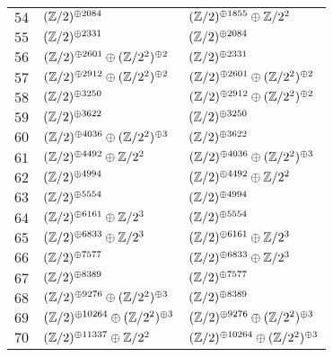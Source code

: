 \begin{supertabular}{|c|p{5.5cm}|p{5.5cm}|}
$54$%
&$(\mathbb{Z}/2)^{\oplus2084}$%
&$(\mathbb{Z}/2)^{\oplus1855}\oplus\mathbb{Z}/2^{2}$\\

$55$%
&$(\mathbb{Z}/2)^{\oplus2331}$%
&$(\mathbb{Z}/2)^{\oplus2084}$\\

$56$%
&$(\mathbb{Z}/2)^{\oplus2601}\oplus(\mathbb{Z}/2^{2})^{\oplus2}$%
&$(\mathbb{Z}/2)^{\oplus2331}$\\

$57$%
&$(\mathbb{Z}/2)^{\oplus2912}\oplus(\mathbb{Z}/2^{2})^{\oplus2}$%
&$(\mathbb{Z}/2)^{\oplus2601}\oplus(\mathbb{Z}/2^{2})^{\oplus2}$\\

$58$%
&$(\mathbb{Z}/2)^{\oplus3250}$%
&$(\mathbb{Z}/2)^{\oplus2912}\oplus(\mathbb{Z}/2^{2})^{\oplus2}$\\

$59$%
&$(\mathbb{Z}/2)^{\oplus3622}$%
&$(\mathbb{Z}/2)^{\oplus3250}$\\

$60$%
&$(\mathbb{Z}/2)^{\oplus4036}\oplus(\mathbb{Z}/2^{2})^{\oplus3}$%
&$(\mathbb{Z}/2)^{\oplus3622}$\\


$61$%
&$(\mathbb{Z}/2)^{\oplus4492}\oplus\mathbb{Z}/2^{2}$%
&$(\mathbb{Z}/2)^{\oplus4036}\oplus(\mathbb{Z}/2^{2})^{\oplus3}$\\

$62$%
&$(\mathbb{Z}/2)^{\oplus4994}$%
&$(\mathbb{Z}/2)^{\oplus4492}\oplus\mathbb{Z}/2^{2}$\\

$63$%
&$(\mathbb{Z}/2)^{\oplus5554}$%
&$(\mathbb{Z}/2)^{\oplus4994}$\\

$64$%
&$(\mathbb{Z}/2)^{\oplus6161}\oplus\mathbb{Z}/2^{3}$%
&$(\mathbb{Z}/2)^{\oplus5554}$\\

$65$%
&$(\mathbb{Z}/2)^{\oplus6833}\oplus\mathbb{Z}/2^{3}$%
&$(\mathbb{Z}/2)^{\oplus6161}\oplus\mathbb{Z}/2^{3}$\\

$66$%
&$(\mathbb{Z}/2)^{\oplus7577}$%
&$(\mathbb{Z}/2)^{\oplus6833}\oplus\mathbb{Z}/2^{3}$\\

$67$%
&$(\mathbb{Z}/2)^{\oplus8389}$%
&$(\mathbb{Z}/2)^{\oplus7577}$\\

$68$%
&$(\mathbb{Z}/2)^{\oplus9276}\oplus(\mathbb{Z}/2^{2})^{\oplus3}$%
&$(\mathbb{Z}/2)^{\oplus8389}$\\

$69$%
&$(\mathbb{Z}/2)^{\oplus10264}\oplus(\mathbb{Z}/2^{2})^{\oplus3}$%
&$(\mathbb{Z}/2)^{\oplus9276}\oplus(\mathbb{Z}/2^{2})^{\oplus3}$\\

$70$%
&$(\mathbb{Z}/2)^{\oplus11337}\oplus\mathbb{Z}/2^{2}$%
&$(\mathbb{Z}/2)^{\oplus10264}\oplus(\mathbb{Z}/2^{2})^{\oplus3}$\\


\end{supertabular}

